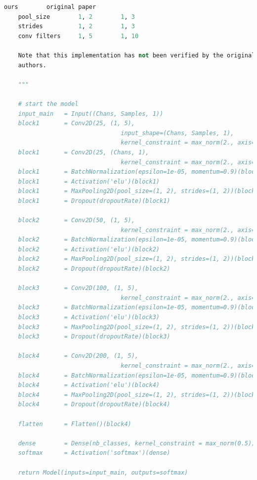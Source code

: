 \documentclass[conference]{IEEEtran}
\begin{document}
\begin{lstlisting}[language=Python, caption=Machine Learning Model, label=ml_model]
                      ours        original paper
    pool_size        1, 2        1, 3
    strides          1, 2        1, 3
    conv filters     1, 5        1, 10
    
    Note that this implementation has not been verified by the original 
    authors. 
    
    """

    # start the model
    input_main   = Input((Chans, Samples, 1))
    block1       = Conv2D(25, (1, 5), 
                                 input_shape=(Chans, Samples, 1),
                                 kernel_constraint = max_norm(2., axis=(0,1,2)))(input_main)
    block1       = Conv2D(25, (Chans, 1),
                                 kernel_constraint = max_norm(2., axis=(0,1,2)))(block1)
    block1       = BatchNormalization(epsilon=1e-05, momentum=0.9)(block1)
    block1       = Activation('elu')(block1)
    block1       = MaxPooling2D(pool_size=(1, 2), strides=(1, 2))(block1)
    block1       = Dropout(dropoutRate)(block1)
  
    block2       = Conv2D(50, (1, 5),
                                 kernel_constraint = max_norm(2., axis=(0,1,2)))(block1)
    block2       = BatchNormalization(epsilon=1e-05, momentum=0.9)(block2)
    block2       = Activation('elu')(block2)
    block2       = MaxPooling2D(pool_size=(1, 2), strides=(1, 2))(block2)
    block2       = Dropout(dropoutRate)(block2)
    
    block3       = Conv2D(100, (1, 5),
                                 kernel_constraint = max_norm(2., axis=(0,1,2)))(block2)
    block3       = BatchNormalization(epsilon=1e-05, momentum=0.9)(block3)
    block3       = Activation('elu')(block3)
    block3       = MaxPooling2D(pool_size=(1, 2), strides=(1, 2))(block3)
    block3       = Dropout(dropoutRate)(block3)
    
    block4       = Conv2D(200, (1, 5),
                                 kernel_constraint = max_norm(2., axis=(0,1,2)))(block3)
    block4       = BatchNormalization(epsilon=1e-05, momentum=0.9)(block4)
    block4       = Activation('elu')(block4)
    block4       = MaxPooling2D(pool_size=(1, 2), strides=(1, 2))(block4)
    block4       = Dropout(dropoutRate)(block4)
    
    flatten      = Flatten()(block4)
    
    dense        = Dense(nb_classes, kernel_constraint = max_norm(0.5))(flatten)
    softmax      = Activation('softmax')(dense)
    
    return Model(inputs=input_main, outputs=softmax)



\end{lstlisting}
\end{document}

